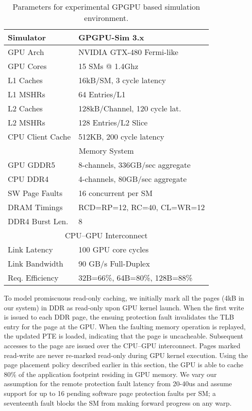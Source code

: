 \begin{table}[t]
\begin{center}
\begin{tabular}{|l|l|}
\hline
Simulator & GPGPU-Sim 3.x\\
\hline
GPU Arch & NVIDIA GTX-480 Fermi-like\\
\hline
GPU Cores& 15 SMs @ 1.4Ghz\\
\hline
L1 Caches & 16kB/SM, 3 cycle latency\\
\hline
L1 MSHRs & 64 Entries/L1\\
\hline
L2 Caches & 128kB/Channel, 120 cycle lat.\\
\hline
L2 MSHRs & 128 Entries/L2 Slice\\
\hline
CPU Client Cache & 512KB, 200 cycle latency\\
\hline
\hline
\multicolumn{2}{|c|}{Memory System}\\
\hline
GPU GDDR5 & 8-channels, 336GB/sec aggregate\\
\hline
CPU DDR4& 4-channels, 80GB/sec aggregate\\
\hline
SW Page Faults& 16 concurrent per SM\\
\hline
DRAM Timings & \multicolumn{1}{|l|}{RCD=RP=12, RC=40, CL=WR=12}\\
\hline
DDR4 Burst Len.& 8\\
\hline
\hline
\multicolumn{2}{|c|}{CPU--GPU Interconnect}\\
\hline
Link Latency& 100 GPU core cycles\\
\hline
Link Bandwidth& 90 GB/s Full-Duplex\\
\hline
Req. Efficiency& 32B=66\%, 64B=80\%, 128B=88\%\\
\hline
\end{tabular}
\caption{Parameters for experimental GPGPU based simulation environment.}
\label{tab:methodology}
\end{center}
\vspace{-.1in}
\end{table}

To model promiscuous read-only caching, we initially mark all the pages (4kB
in our system) in DDR as read-only upon GPU kernel launch. When the first 
write is issued to each DDR page, the ensuing
protection fault invalidates the TLB entry for the page at the GPU. 
When the faulting memory operation is replayed, the updated 
PTE is loaded, indicating that the page is uncacheable.  Subsequent accesses
to the page are issued over the CPU--GPU interconnect.
Pages marked read-write are never re-marked
read-only during GPU kernel execution. Using the page placement policy described
earlier in this section, the GPU is able to cache 80\% of the application footprint residing
in GPU memory. We vary our assumption for the remote protection fault latency from
20-40us and assume support for up to 16 pending software
page protection faults per SM; a seventeenth fault blocks the SM from making forward
progress on any warp.

